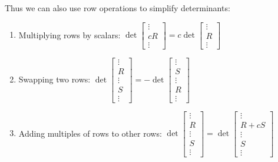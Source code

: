 \begin{fact}
Thus we can also use row operations to simplify determinants:
\begin{enumerate}
\item Multiplying rows by scalars:
  \(\det\begin{bmatrix}\vdots\\cR\\\vdots\end{bmatrix}=
  c\det\begin{bmatrix}\vdots\\R\\\vdots\end{bmatrix}\)
\item Swapping two rows:
  \(\det\begin{bmatrix}\vdots\\R\\\vdots\\S\\\vdots\end{bmatrix}=
  -\det\begin{bmatrix}\vdots\\S\\\vdots\\R\\\vdots\end{bmatrix}\)
\item Adding multiples of rows to other rows:
  \(\det\begin{bmatrix}\vdots\\R\\\vdots\\S\\\vdots\end{bmatrix}=
  \det\begin{bmatrix}\vdots\\R+cS\\\vdots\\S\\\vdots\end{bmatrix}\)
\end{enumerate}
\end{fact}



